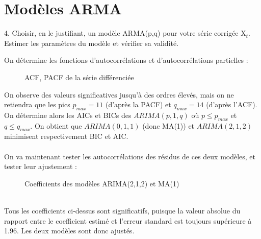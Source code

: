 \documentclass[a4paper, 12pt]{article} %
\begin{document}
\section{Modèles ARMA}
\begin{tcolorbox}
{\small
4. Choisir, en le justifiant, un modèle ARMA(p,q) pour votre série corrigée X$_t$. Estimer les paramètres
du modèle et vérifier sa validité.
}
\end{tcolorbox}
{\normalsize
{On détermine les fonctions d'autocorrélations et d'autocorrélations partielles :
}}
\begin{figure}[h]
    \centering
    \caption{ACF, PACF de la série différenciée}
\end{figure}
\newpage
\normalsize{
{On observe des valeurs significatives jusqu'à des ordres élevés, mais on ne retiendra que les pics $p_{max} = 11$ (d'après la PACF) et $q_{max} = 14$ (d'après l'ACF).\\
On détermine alors les AICs et BICs des $ARIMA(p, 1, q)$ où $p \leqslant p_{max}$ et $q \leqslant q_{max}$. On obtient que $ARIMA(0, 1, 1)$ (donc MA(1)) et $ARIMA(2, 1, 2)$ minimisent respectivement BIC et AIC.\\ \\On va maintenant tester les autocorrélations des résidus de ces deux modèles, et tester leur ajustement :
}}
\begin{figure}[h]
    \centering
    \caption{Coefficients des modèles ARIMA(2,1,2) et MA(1)}
\end{figure}
\normalsize{
{\\Tous les coefficients ci-dessus sont significatifs, puisque la valeur absolue du rapport entre le coefficient estimé et l'erreur standard est toujours supérieure à 1.96. Les deux modèles sont donc ajustés.
}}
\end{document}
